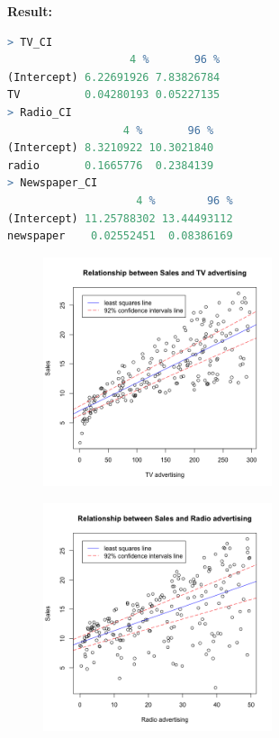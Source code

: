 \documentclass[twoside]{homework}
\begin{document}
\textbf{Result:}
\begin{lstlisting}[language=R]
> TV_CI
                   4 %       96 %
(Intercept) 6.22691926 7.83826784
TV          0.04280193 0.05227135
> Radio_CI
                  4 %       96 %
(Intercept) 8.3210922 10.3021840
radio       0.1665776  0.2384139
> Newspaper_CI
                    4 %        96 %
(Intercept) 11.25788302 13.44493112
newspaper    0.02552451  0.08386169
\end{lstlisting}
\begin{figure}[!h]
\begin{center}
\includegraphics[width=0.6\textwidth]{HW1_P4_1.png}
\end{center}
\newpage
\label{fig:HW1_P4_1}
\end{figure}
\begin{figure}[!h]
\begin{center}
\includegraphics[width=0.6\textwidth]{HW1_P4_2.png}
\end{center}
\label{fig:HW1_P4_2}
\end{figure}
\end{document}
